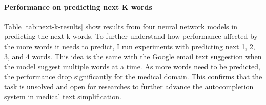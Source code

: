 \documentclass[11pt]{article}
\begin{document}
\begin{table}[t]
\centering
{}
\caption{\label{tab:accuracy-@-n} Accuracy @ N of the RoBERTa, BERT, and XLNet with context on next word prediction}
\end{table}

\paragraph{Performance on predicting next K words}

Table \ref{tab:next-k-results} show results from four neural network models in predicting the next k words. To further understand how performance affected by the more words it needs to predict, I run experiments with predicting next 1, 2, 3, and 4 words. This idea is the same with the Google email text suggestion when the model suggest multiple words at a time. As more words need to be predicted, the performance drop significantly for the medical domain. This confirms that the task is unsolved and open for researches to further advance the autocompletion system in medical text simplification.

\begin{table}[t]
\centering
{}
\caption{\label{tab:next-k-results} Accuracy of the RoBERTa, BERT, XLNet, and GPT-2 with context on next k prediction}
\end{table}
\end{document}
